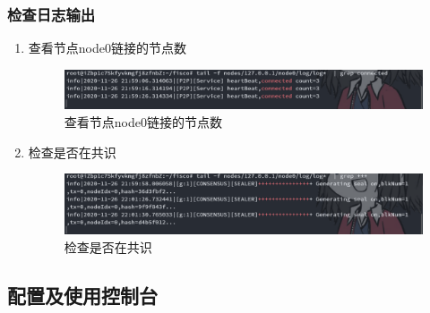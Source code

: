 \documentclass[a4paper, 11pt]{article}
\begin{document}
\subsubsection{检查日志输出}
\begin{enumerate}
      \item 查看节点node0链接的节点数
      \begin{figure}[H]
            \centering
            \includegraphics[width = 0.8 \textwidth]{connected.png}
            \caption{查看节点node0链接的节点数}
      \end{figure}

      \item 检查是否在共识
      \begin{figure}[H]
            \centering
            \includegraphics[width = 0.8 \textwidth]{+++.png}
            \caption{检查是否在共识}
      \end{figure}
\end{enumerate}

\subsection{配置及使用控制台}
\end{document}
